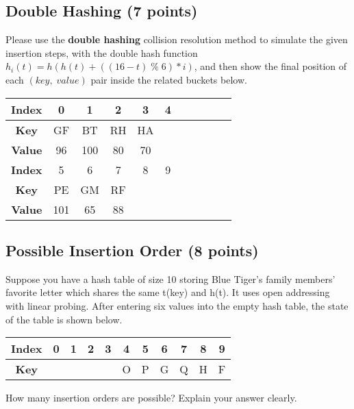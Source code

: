 \documentclass[11pt]{exam}
\begin{document}
\subsection{Double Hashing (7 points)}
Please use the \textbf{double hashing} collision resolution method to simulate the given insertion steps, with the double hash function $h_i(t) = h(h(t)+((16-t)\;\%\; 6) * i)$, and then show the final position of each $(key,\;value)$ pair inside the related buckets below.
\begin{solution}
\begin{table}[H]
\centering
\renewcommand{\arraystretch}{2}
\setlength{\tabcolsep}{11mm}
\begin{tabular}{|c|c|c|c|c|c|c|c|c|c|c|}
\hline
\textbf{Index}&0&1&2&3&4\\
\hline
\textbf{Key}&GF&BT&RH&HA&\\
\hline
\textbf{Value}&96&100&80&70&\\
\hline
\textbf{Index}&5&6&7&8&9\\
\hline
\textbf{Key}&PE&GM&RF&&\\
\hline
\textbf{Value}&101&65&88&&\\
\hline
\end{tabular}
\end{table}
\end{solution}

\subsection{Possible Insertion Order (8 points)}
Suppose you have a hash table of size 10 storing Blue Tiger's family members' favorite letter which shares the same t(key) and h(t). It uses open addressing with linear probing. After entering six values into the empty hash table, the state of the table is shown below.

\begin{table}[H]
\centering
\setlength{\tabcolsep}{5.5mm}
\begin{tabular}{|c|c|c|c|c|c|c|c|c|c|c|}
\hline
\textbf{Index}&0&1&2&3&4&5&6&7&8&9\\
\hline
\textbf{Key}&&&&&O&P&G&Q&H&F\\
\hline
\end{tabular}
\end{table}
How many insertion orders are possible? Explain your answer clearly.
\end{document}
